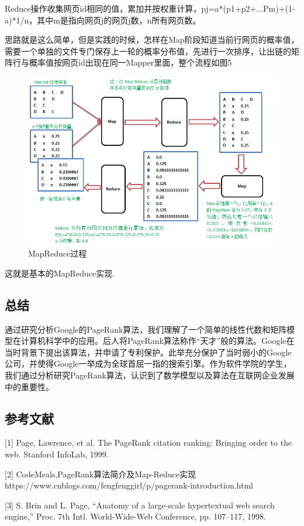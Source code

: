 \documentclass[UTF8
]{ctexart}
\begin{document}
Reduce操作收集网页id相同的值，累加并按权重计算，pj=a*(p1+p2+...Pm)+(1-a)*1/n，其中m是指向网页j的网页j数，n所有网页数。

思路就是这么简单，但是实践的时候，怎样在Map阶段知道当前行网页的概率值，需要一个单独的文件专门保存上一轮的概率分布值，先进行一次排序，让出链的矩阵行与概率值按网页id出现在同一Mapper里面，整个流程如图5

\begin{figure}[htbp]
	\centering
	\includegraphics[width=5.6in]{1_5.jpg}
	\caption{MapReduce过程}
	\label{img5}
\end{figure}
这就是基本的MapReduce实现.

\pagebreak

\hypertarget{header-n97}{%
\subsection{总结}\label{header-n97}}
通过研究分析Google的PageRank算法，我们理解了一个简单的线性代数和矩阵模型在计算机科学中的应用。后人将PageRank算法称作“天才”般的算法。Google在当时背景下提出该算法，并申请了专利保护。此举充分保护了当时弱小的Google公司，并使得Google一举成为全球首屈一指的搜索引擎。作为软件学院的学生，我们通过分析研究PageRank算法，认识到了数学模型以及算法在互联网企业发展中的重要性。



\hypertarget{header-n98}{
\subsection{参考文献}\label{header-n98}}
[1] Page, Lawrence, et al. The PageRank citation ranking: Bringing order to the web. Stanford InfoLab, 1999.

[2] CodeMeals,PageRank算法简介及Map-Reduce实现\\
 https://www.cnblogs.com/fengfenggirl/p/pagerank-introduction.html

[3] S. Brin and L. Page, “Anatomy of a large-scale hypertextual web search engine,” Proc. 7th Intl. World-Wide-Web Conference, pp. 107–117, 1998.
\end{document}
